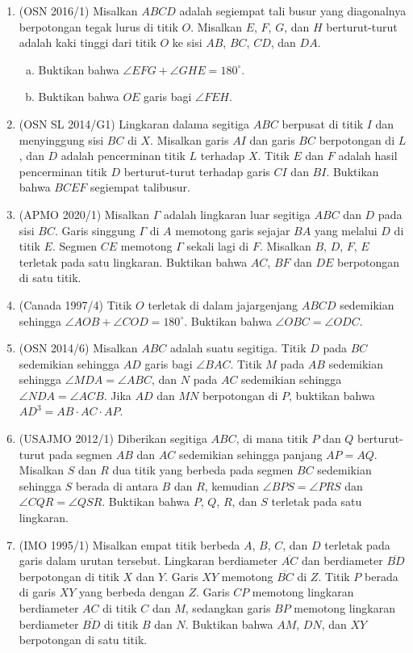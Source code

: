 \documentclass[a4paper, 11pt]{article}
\begin{document}
\begin{enumerate}
\item (OSN 2016/1) Misalkan $ABCD$ adalah segiempat tali busur yang diagonalnya berpotongan tegak lurus di titik $O$. Misalkan $E$, $F$, $G$, dan $H$ berturut-turut adalah kaki tinggi dari titik $O$ ke sisi $AB$, $BC$, $CD$, dan $DA$.
\begin{enumerate}[(a).]
\item Buktikan bahwa $\angle EFG+\angle GHE=180^\circ$.
\item Buktikan bahwa $OE$ garis bagi $\angle FEH$.
\end{enumerate}
\item (OSN SL 2014/G1) Lingkaran dalama segitiga $ABC$ berpusat di titik $I$ dan menyinggung sisi $BC$ di $X$. Misalkan garis $AI$ dan garis $BC$ berpotongan di $L$, dan $D$ adalah pencerminan titik $L$ terhadap $X$. Titik $E$ dan $F$ adalah hasil pencerminan titik $D$ berturut-turut terhadap garis $CI$ dan $BI$. Buktikan bahwa $BCEF$ segiempat talibusur.
\item(APMO 2020/1) Misalkan $\Gamma$ adalah lingkaran luar segitiga $ABC$ dan $D$ pada sisi $BC$. Garis singgung $\Gamma$ di $A$ memotong garis sejajar $BA$ yang melalui $D$ di titik $E$. Segmen $CE$ memotong $\Gamma$ sekali lagi di $F$. Misalkan $B$, $D$, $F$, $E$ terletak pada satu lingkaran. Buktikan bahwa $AC$, $BF$ dan $DE$ berpotongan di satu titik.
\item (Canada 1997/4) Titik $O$ terletak di dalam jajargenjang $ABCD$ sedemikian sehingga $\angle AOB+\angle COD=180^\circ$. Buktikan bahwa $\angle OBC=\angle ODC$.
\item (OSN 2014/6) Misalkan $ABC$ adalah suatu segitiga. Titik $D$ pada $BC$ sedemikian sehingga $AD$ garis bagi $\angle BAC$. Titik $M$ pada $AB$ sedemikian sehingga $\angle MDA=\angle ABC$, dan $N$ pada $AC$ sedemikian sehingga $\angle NDA=\angle ACB$. Jika $AD$ dan $MN$ berpotongan di $P$, buktikan bahwa $AD^3=AB\cdot AC\cdot AP$.
\item (USAJMO 2012/1) Diberikan segitiga $ABC$, di mana titik $P$ dan $Q$ berturut-turut pada segmen $AB$ dan $AC$ sedemikian sehingga panjang $AP=AQ$. Misalkan $S$ dan $R$ dua titik yang berbeda pada segmen $BC$ sedemikian sehingga $S$ berada di antara $B$ dan $R$, kemudian $\angle BPS=\angle PRS$ dan $\angle CQR=\angle QSR$. Buktikan bahwa $P$, $Q$, $R$, dan $S$ terletak pada satu lingkaran.
\item (IMO 1995/1) Misalkan empat titik berbeda $A$, $B$, $C$, dan $D$ terletak pada garis dalam urutan tersebut. Lingkaran berdiameter $\overline{AC}$ dan berdiameter $\overline{BD}$ berpotongan di titik $X$ dan $Y$. Garis $XY$ memotong $\overline{BC}$ di $Z$. Titik $P$ berada di garis $XY$ yang berbeda dengan $Z$. Garis $CP$ memotong lingkaran berdiameter $AC$ di titik $C$ dan $M$, sedangkan garis $BP$ memotong lingkaran berdiameter $\overline{BD}$ di titik $B$ dan $N$. Buktikan bahwa $AM$, $DN$, dan $XY$ berpotongan di satu titik.

\end{enumerate}
\end{document}
